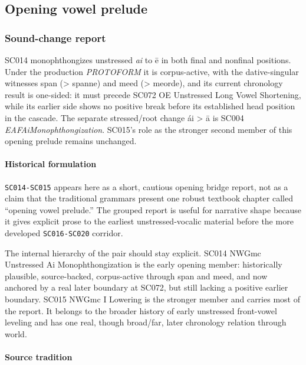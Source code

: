 \documentclass[
  british,
  a4paper,
]{article}
\begin{document}
\subsection{Opening vowel prelude}\label{opening-vowel-prelude}

\subsubsection{Sound-change report}\label{sound-change-report-11}

SC014 monophthongizes unstressed \emph{ai} to ē in both final and
nonfinal positions. Under the production \emph{PROTOFORM} it is
corpus-active, with the dative-singular witnesses span (\textgreater{}
spanne) and meed (\textgreater{} meorde), and its current chronology
result is one-sided: it must precede SC072 OE Unstressed Long Vowel
Shortening, while its earlier side shows no positive break before its
established head position in the cascade. The separate stressed/root
change ái \textgreater{} ā is SC004 \emph{EAFAiMonophthongization}.
SC015's role as the stronger second member of this opening prelude
remains unchanged.

\paragraph{Historical formulation}\label{historical-formulation-11}

\texttt{SC014-SC015} appears here as a short, cautious opening bridge
report, not as a claim that the traditional grammars present one robust
textbook chapter called ``opening vowel prelude.'' The grouped report is
useful for narrative shape because it gives explicit prose to the
earliest unstressed-vocalic material before the more developed
\texttt{SC016-SC020} corridor.

The internal hierarchy of the pair should stay explicit. SC014 NWGmc
Unstressed Ai Monophthongization is the early opening member:
historically plausible, source-backed, corpus-active through span and
meed, and now anchored by a real later boundary at SC072, but still
lacking a positive earlier boundary. SC015 NWGmc I Lowering is the
stronger member and carries most of the report. It belongs to the
broader history of early unstressed front-vowel leveling and has one
real, though broad/far, later chronology relation through world.

\paragraph{Source tradition}\label{source-tradition-11}
\end{document}
